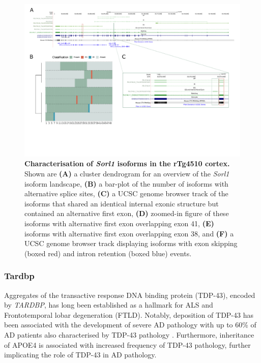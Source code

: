 \begin{landscape}
	\begin{figure}[htp]
		\centering
		\captionsetup{width=1.3\textwidth}
		\includegraphics[page=10,trim={0 0.5cm 0 0},scale = 0.8]{Figures/TargetGenes_Annotation_Landscape.pdf}
		\caption[Characterisation of the \textit{Sorl1} isoform landscape]%
		{\textbf{Characterisation of \textit{Sorl1} isoforms in the rTg4510 cortex.} Shown are \textbf{(A)} a cluster dendrogram for an overview of the \textit{Sorl1} isoform landscape, \textbf{(B)} a bar-plot of the number of isoforms with alternative splice sites, \textbf{(C)} a UCSC genome browser track of the isoforms that shared an identical internal exonic structure but contained an alternative first exon, \textbf{(D)} zoomed-in figure of these isoforms with alternative first exon overlapping exon 41, \textbf{(E)} isoforms with alternative first exon overlapping exon 38, and \textbf{(F)} a UCSC genome browser track displaying isoforms with exon skipping (boxed red) and intron retention (boxed blue) events.}    
		\label{fig:sorl1}
	\end{figure}
\end{landscape}
\restoregeometry

\newpage
\subsubsection{Tardbp}
Aggregates of the transactive response DNA binding protein (TDP-43), encoded by \textit{TARDBP}, has long been established as a hallmark for ALS and Frontotemporal lobar degeneration (FTLD)\cite{Meneses2021}. Notably, deposition of TDP-43 has been associated with the development of severe AD pathology with up to 60\% of AD patients also characterised by TDP-43 pathology \cite{Brouwers2010}. Furthermore, inheritance of APOE4 is associated with increased frequency of TDP-43 pathology, further implicating the role of TDP-43 in AD pathology\cite{Meneses2021}. 


